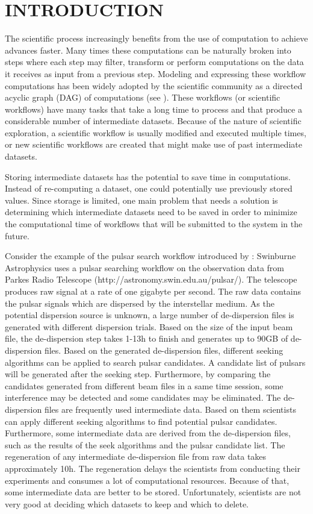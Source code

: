 \chapter{INTRODUCTION}
\label{chap:introduction}
The scientific process increasingly benefits from the use of computation to achieve advances faster. Many times these computations can be naturally broken into steps where each step may filter, transform or perform computations on the data it receives as input from a previous step.  Modeling and expressing these workflow computations has been widely adopted by the scientific community as a directed acyclic graph (DAG) of computations (see \cite{liu2015survey}).  These workflows (or scientific workflows) have many tasks that take a long time to process and that produce a considerable number of intermediate datasets.  Because of the nature of scientific exploration, a scientific workflow is usually modified and executed multiple times, or new scientific workflows are created that might make use of past intermediate datasets.  

Storing intermediate datasets has the potential to save time in computations. Instead of re-computing a dataset, one could potentially use previously stored values. Since storage is limited, one main problem that needs a solution is determining which intermediate datasets need to be saved in order to minimize the computational time of workflows that will be submitted to the system in the future. 

Consider the example of the pulsar search workflow introduced by \cite{yuan2012data}: Swinburne Astrophysics uses a pulsar searching workflow on the observation data from Parkes Radio Telescope (http://astronomy.swin.edu.au/pulsar/). The telescope produces raw signal at a rate of one gigabyte per second.  The raw data contains the pulsar signals which are dispersed by the interstellar medium. As the potential dispersion source is unknown, a large number of de-dispersion files is generated with different dispersion trials. Based on the size of the input beam file, the de-dispersion step takes 1-13h to finish and generates up to 90GB of de-dispersion files.  Based on the generated de-dispersion files, different seeking algorithms can be applied to search pulsar candidates.  A candidate list of pulsars will be generated after the seeking step.  Furthermore, by comparing the candidates generated from different beam files in a same time session, some interference may be detected and some candidates may be eliminated.  The de-dispersion files are frequently used intermediate data.  Based on them scientists can apply different seeking algorithms to find potential pulsar candidates.  Furthermore, some intermediate data are derived from the de-dispersion files, such as the results of the seek algorithms and the pulsar candidate list. The regeneration of any intermediate de-dispersion file from raw data takes approximately 10h. The regeneration delays the scientists from conducting their experiments and consumes a lot of computational resources. Because of that, some intermediate data are better to be stored. Unfortunately, scientists are not very good at deciding which datasets to keep and which to delete.

